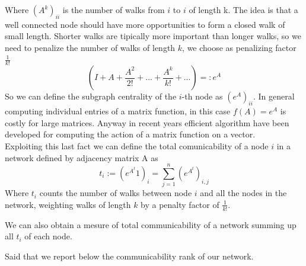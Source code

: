 \documentclass{article}%
\begin{document}
Where $(A^{k})_{ii}$ is the number of walks from $i$ to $i$ of length k. The idea is that a well connected node should have more opportunities to form a closed walk of small length. 
Shorter walks are tipically more important than longer walks, so we need to penalize the number of walks of length $k$, we choose as penalizing factor $\frac{1}{k!}$
\[ (I+A+\frac{A^2}{2!}+ ...+\frac{A^k}{k!}+...) =:e^A
\]
So we can define the subgraph centrality of the $i$-th node as $(e^A)_{ii}$. In general computing individual entries of a matrix function, in this case $f(A)=e^A$ is costly for large matrices. Anyway in recent years efficient algorithm have been developed for computing the action of a matrix function on a vector.
\\

Exploiting this last fact we can define the total comunicability of a node $i$ in a network defined by adjacency matrix A as
\[ t_i:=(e^{A^t}1)_i=\sum_{j=1}^n (e^{A^t})_{i,j}
\]
Where $t_i$ counts the number of walks between node $i$ and all the nodes in the network, weighting walks of length $k$ by a penalty factor of $\frac{1}{k!}$.


We can also obtain a mesure of total communicability of a network summing up all $t_i$ of each node.

Said that we report below the communicability rank of our network.
\\
\end{document}
